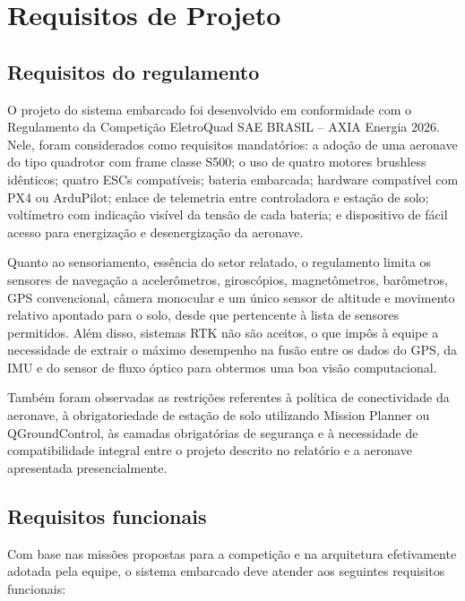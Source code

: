 \section{Requisitos de Projeto}

\subsection{Requisitos do regulamento}

O projeto do sistema embarcado foi desenvolvido em conformidade com o Regulamento da Competição EletroQuad SAE BRASIL -- AXIA Energia 2026. Nele, foram considerados como requisitos mandatórios: a adoção de uma aeronave do tipo quadrotor com frame classe S500; o uso de quatro motores brushless idênticos; quatro ESCs compatíveis; bateria embarcada; hardware compatível com PX4 ou ArduPilot; enlace de telemetria entre controladora e estação de solo; voltímetro com indicação visível da tensão de cada bateria; e dispositivo de fácil acesso para energização e desenergização da aeronave.

Quanto ao sensoriamento, essência do setor relatado, o regulamento limita os sensores de navegação a acelerômetros, giroscópios, magnetômetros, barômetros, GPS convencional, câmera monocular e um único sensor de altitude e movimento relativo apontado para o solo, desde que pertencente à lista de sensores permitidos. Além disso, sistemas RTK não são aceitos, o que impôs à equipe a necessidade de extrair o máximo desempenho na fusão entre os dados do GPS, da IMU e do sensor de fluxo óptico para obtermos uma boa visão computacional.

Também foram observadas as restrições referentes à política de conectividade da aeronave, à obrigatoriedade de estação de solo utilizando Mission Planner ou QGroundControl, às camadas obrigatórias de segurança e à necessidade de compatibilidade integral entre o projeto descrito no relatório e a aeronave apresentada presencialmente.

\subsection{Requisitos funcionais}

Com base nas missões propostas para a competição e na arquitetura efetivamente adotada pela equipe, o sistema embarcado deve atender aos seguintes requisitos funcionais:

